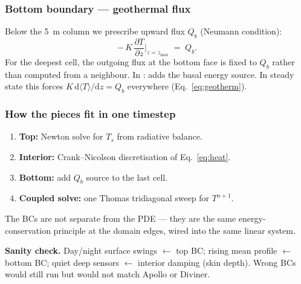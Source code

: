 \subsubsection{Bottom boundary --- geothermal flux}
Below the 5~m column we prescribe upward flux $Q_b$ (Neumann condition):
\begin{equation}
  -\,K\,\frac{\partial T}{\partial z}\Big|_{z=z_{\mathrm{max}}} \;=\; Q_b.
  \label{eq:bc-bot-teach}
\end{equation}
For the deepest cell, the outgoing flux at the bottom face is fixed to $Q_b$
rather than computed from a neighbour. In :
 adds the basal energy source. In steady
state this forces $K\,\mathrm{d}\langle T\rangle/\mathrm{d}z=Q_b$ everywhere
(Eq.~\eqref{eq:geotherm}).

\subsubsection{How the pieces fit in one timestep}
\begin{enumerate}[leftmargin=1.5em,itemsep=2pt]
  \item \textbf{Top:} Newton solve for $T_s$ from radiative balance.
  \item \textbf{Interior:} Crank--Nicolson discretisation of Eq.~\eqref{eq:heat}.
  \item \textbf{Bottom:} add $Q_b$ source to the last cell.
  \item \textbf{Coupled solve:} one Thomas tridiagonal sweep for $T^{n+1}$.
\end{enumerate}
The BCs are not separate from the PDE --- they are the same energy-conservation
principle at the domain edges, wired into the same linear system.

\begin{headsup}
\textbf{Sanity check.} Day/night surface swings $\leftarrow$ top BC;
rising mean profile $\leftarrow$ bottom BC; quiet deep sensors $\leftarrow$
interior damping (skin depth). Wrong BCs would still run but would not match
Apollo or Diviner.
\end{headsup}


